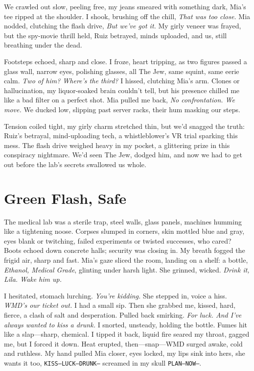 \documentclass[12pt,oneside]{book} %
\newcommand{\note}[1]{\texttt{#1}}
\begin{document}
We crawled out slow, peeling free, my jeans smeared with something dark, Mia’s tee ripped at the shoulder. I shook, brushing off the chill, \textit{That was too close.} Mia nodded, clutching the flash drive, \textit{But we’ve got it.} My girly veneer was frayed, but the spy-movie thrill held, Ruiz betrayed, minds uploaded, and us, still breathing under the dead.

Footsteps echoed, sharp and close. I froze, heart tripping, as two figures passed a glass wall, narrow eyes, polishing glasses, all The Jew, same squint, same eerie calm. \textit{Two of him? Where's the third?} I hissed, clutching Mia’s arm. Clones or hallucination, my liquor-soaked brain couldn’t tell, but his presence chilled me like a bad filter on a perfect shot. Mia pulled me back, \textit{No confrontation. We move.} We ducked low, slipping past server racks, their hum masking our steps.

Tension coiled tight, my girly charm stretched thin, but we’d snagged the truth: Ruiz’s betrayal, mind-uploading tech, a whistleblower’s VR trial sparking this mess. The flash drive weighed heavy in my pocket, a glittering prize in this conspiracy nightmare. We’d seen The Jew, dodged him, and now we had to get out before the lab’s secrets swallowed us whole.

\chapter{Green Flash, Safe}

The medical lab was a sterile trap, steel walls, glass panels, machines humming like a tightening noose. Corpses slumped in corners, skin mottled blue and gray, eyes blank or twitching, failed experiments or twisted successes, who cared? Boots echoed down concrete halls; security was closing in. My breath fogged the frigid air, sharp and fast. Mia’s gaze sliced the room, landing on a shelf: a bottle, \textit{Ethanol, Medical Grade}, glinting under harsh light. She grinned, wicked. \textit{Drink it, Lila. Wake him up.}

I hesitated, stomach lurching. \textit{You’re kidding.} 
She stepped in, voice a hiss. \textit{WMD’s our ticket out.} I had a small sip. Then she grabbed me, kissed, hard, fierce, a clash of salt and desperation. Pulled back smirking. \textit{For luck. And I’ve always wanted to kiss a drunk.}  
I snorted, unsteady, holding the bottle. Fumes hit like a slap—sharp, chemical. I tipped it back, liquid fire seared my throat, gagged me, but I forced it down. Heat erupted, then—snap—WMD surged awake, cold and ruthless. My hand pulled Mia closer, eyes locked, my lips sink into hers, she wants it too, \note {KISS—LUCK—DRUNK—} screamed in my skull \note{PLAN—NOW—}.
\end{document}
